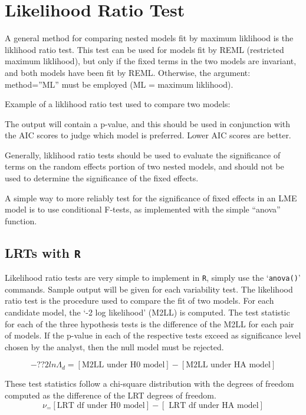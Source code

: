 \documentclass[12pt, a4paper]{report}
\theoremstyle{plain}
\theoremstyle{definition}
\theoremstyle{remark}
\begin{document}
	\section{Likelihood Ratio Test}
	A general method for comparing nested models fit by maximum liklihood is the liklihood ratio 
	test. This test can be used for models fit by REML (restricted maximum liklihood), but only if the 
	fixed terms in the two models are invariant, and both models have been fit by REML. Otherwise, 
	the argument: method=”ML” must be employed (ML = maximum liklihood). 
	
	Example of a liklihood ratio test used to compare two models: 
	
	
	
	The output will contain a p-value, and this should be used in conjunction with the AIC scores to 
	judge which model is preferred. Lower AIC scores are better. 
	
	Generally, liklihood ratio tests should be used to evaluate the significance of terms on the 
	random effects portion of two nested models, and should not be used to determine the 
	significance of the fixed effects. 
	
	A simple way to more reliably test for the significance of fixed effects in an LME model is to use 
	conditional F-tests, as implemented with the simple “anova” function. 
	

	
	
	
	
	
\subsection{LRTs with \texttt{R}}
Likelihood ratio tests are very simple to implement in \texttt{R}, simply use the `\texttt{anova()}'
commands. Sample output will be given for each variability test. The likelihood ratio
test is the procedure used to compare the fit of two models. For each candidate model,
the `-2 log likelihood' (M2LL) is computed. The test statistic for each of the three
hypothesis tests is the difference of the M2LL for each pair of models. If the p-value
in each of the respective tests exceed as significance level chosen by the analyst, then
the null model must be rejected.

\begin{equation}
-??2 ln \Lambda_d = [\mbox{M2LL under H0 model}] - [\mbox{M2LL under HA model}] 
\end{equation}

These test statistics follow a chi-square distribution with the degrees of freedom
computed as the difference of the LRT degrees of freedom.
\begin{equation}	
\nu_ = [ \mbox{LRT df under H0 model}] - [\mbox{ LRT df under HA model}]
\end{equation}	
\end{document}

